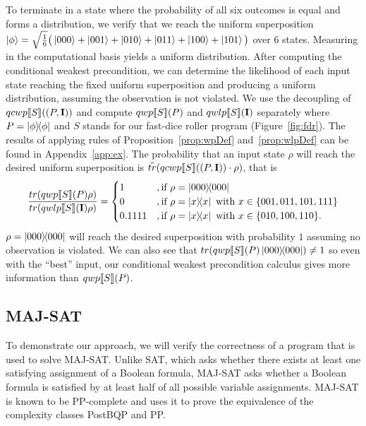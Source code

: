 \documentclass[a4paper,UKenglish,cleveref, autoref, thm-restate]{lipics-v2021}
\begin{document}
To terminate in a state where the probability of all six outcomes is equal and forms a distribution, we verify that we reach the uniform superposition $\ket{\phi} = \sqrt{\frac{1}{6}}\big(\ket{000}+\ket{001}+\ket{010}+\ket{011}+\ket{100}+\ket{101}\big)$ over $6$ states. Measuring in the computational basis yields a uniform distribution. After computing the conditional weakest precondition, we can determine the likelihood of each input state reaching the fixed uniform superposition and producing a uniform distribution, assuming the observation is not violated.
We use the decoupling of $qcwp\llbracket S \rrbracket ((P,\textbf{I}))$ and compute $qwp\llbracket S \rrbracket (P)$ and $qwlp\llbracket S \rrbracket (\textbf{I})$ separately where $P = \ketbra{\phi}{\phi}$ and $S$ stands for our fast-dice roller program (Figure~\ref{fig:fdr}). The results of applying rules of Proposition~\ref{prop:wpDef} and~\ref{prop:wlpDef} can be found in Appendix~\ref{app:ex}.
The probability that an input state $\rho$ will reach the desired uniform superposition is $\hat{tr}(qcwp\llbracket S \rrbracket ((P,\textbf{I})) \cdot \rho)$, that is
\begin{align*}
  \frac{tr(qwp\llbracket S \rrbracket (P)\rho)}{tr(qwlp\llbracket S \rrbracket (\textbf{I})\rho)}=\begin{cases}
    1 &,\text{if }\rho=\ketbra{000}{000}\\
    0 &, \text{if }\rho=\ketbra{x}{x} \text{ with } x\in\{001,011,101,111\}\\
    0.1111 &,\text{if }\rho=\ketbra{x}{x} \text{ with } x\in\{010,100,110\}.
  \end{cases}
\end{align*}
$\rho=\ketbra{000}{000}$ will reach the desired superposition with probability $1$ assuming no observation is violated. We can also see that $tr(qwp\llbracket S \rrbracket (P)\ketbra{000}{000})\neq 1$ so even with the ``best'' input, our conditional weakest precondition calculus gives more information than $qwp\llbracket S \rrbracket (P)$.


\subsection{MAJ-SAT}
To demonstrate our approach, we will verify the correctness of a program that is used to solve MAJ-SAT. Unlike SAT, which asks whether there exists at least one satisfying assignment of a Boolean formula, MAJ-SAT asks whether a Boolean formula is satisfied by at least half of all possible variable assignments. MAJ-SAT is known to be PP-complete and \cite{postbqp} uses it to prove the equivalence of the complexity classes PostBQP and PP.
\end{document}
